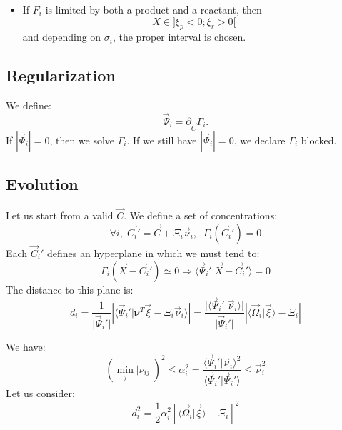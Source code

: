 \documentclass[aps,12pt]{revtex4}
\begin{document}
\begin{itemize}
\begin{itemize}
	\item If $F_i$ is limited by both a product and a reactant, then $$X\in\rbrack \xi_p < 0 ; \xi_r > 0 \lbrack$$
	and depending on $\sigma_i$, the proper interval is chosen.
	\end{itemize}
	
\end{itemize}



 \subsection{Regularization}
We define:
\begin{equation}
\vec{\Psi}_i = \partial_{\vec{C}} \Gamma_i.
\end{equation}
If $|\vec{\Psi}_i|=0$, then we solve $\Gamma_i$. If we still have $|\vec{\Psi}_i|=0$, we declare $\Gamma_i$ blocked.

\subsection{Evolution}
Let us start from a valid $\vec{C}$.
We define a set of concentrations:
\begin{equation}
	\forall i,\;\vec{C_i}' = \vec{C} + \Xi_i \vec{\nu}_i,\;\;\Gamma_i(\vec{C}_i') = 0
\end{equation}
Each $\vec{C}_i'$ defines an hyperplane in which we must tend to:
\begin{equation}
	\Gamma_i(\vec{X}-\vec{C}_i') \simeq 0 \Rightarrow \langle\vec{\Psi}_i'\vert \vec{X}-\vec{C}_i' \rangle = 0
\end{equation}
The distance to this plane is:
\begin{equation}
	d_i = \dfrac{1}{\vert \vec{\Psi}_i' \vert}
	\left\vert \langle \vec{\Psi}_i' \vert \bm{\nu}^T \vec{\xi} - \Xi_i \vec{\nu}_i \rangle \right\vert
	=   \dfrac{ \vert\langle \vec{\Psi}_i' \vert \vec{\nu}_i \rangle \vert }{  \vert \vec{\Psi}_i' \vert } 
	\left\vert \langle \vec{\Omega}_i \vert \vec{\xi}\rangle - \Xi_i \right\vert
\end{equation}

We have:
\begin{equation}
	\left(\min_j \vert\nu_{ij}\vert\right)^2 \leq \alpha_i^2 = \dfrac{  \langle \vec{\Psi}_i' \vert \vec{\nu}_i \rangle ^2 }{  \langle \vec{\Psi}_i' \vert \vec{\Psi}_i' \rangle } 
	\leq \vec{\nu}_i^2
\end{equation}
Let us consider:
\begin{equation}
	d_i^2 = \dfrac{1}{2} \alpha_i^2 \left[ \langle \vec{\Omega}_i \vert \vec{\xi}\rangle - \Xi_i \right] ^2 
\end{equation}
\end{document}
